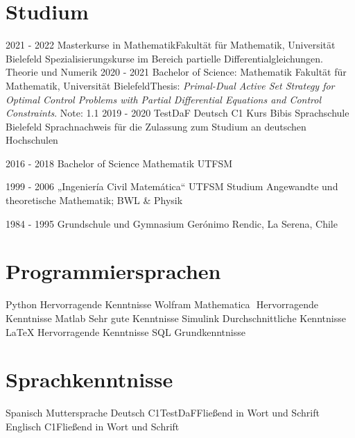 \documentclass[a4paper]{cv-class}
\begin{document}
\section{Studium}
\begin{entrylist}
\entry
{2021 - 2022}
{Masterkurse in Mathematik}{Fakultät für Mathematik, Universität Bielefeld}{ Spezialisierungskurse im Bereich partielle Differentialgleichungen. Theorie und Numerik}
\entry
{2020 - 2021}
{Bachelor of Science: Mathematik}
{Fakultät für Mathematik, Universität Bielefeld}{Thesis: {\sl Primal-Dual Active Set Strategy for Optimal Control
Problems with Partial Differential Equations and Control Constraints}. Note: 1.1}
\entry
{2019 - 2020}
{TestDaF Deutsch C1 Kurs} 
{Bibis Sprachschule Bielefeld}
{Sprachnachweis für die Zulassung zum Studium an deutschen Hochschulen}


\entry
    {2016 - 2018}
    {Bachelor of Science Mathematik}
    {UTFSM}
    
  \entry
    {1999 - 2006}
    {„Ingenier\'ia Civil Matem\'atica“}
    {UTFSM}
        {Studium Angewandte und theoretische Mathematik; BWL \& Physik}
        
    
\entry
{1984 - 1995}
{Grundschule und Gymnasium}
{Ger\'onimo Rendic, La Serena, Chile}
{}
\end{entrylist}
\section{Programmiersprachen}
\begin{entrylist}
\entry
{Python}
{Hervorragende Kenntnisse}{}{}
\entry
{Wolfram Mathematica\!}
{\,\,Hervorragende Kenntnisse}{}{}
\entry
{Matlab}
{Sehr gute Kenntnisse}{}{}
\entry
{Simulink}
{Durchschnittliche Kenntnisse}{}{}
\entry
{\LaTeX{}}
{Hervorragende Kenntnisse}{}{}
\entry
{SQL}
{Grundkenntnisse}{}{}
\end{entrylist}
\section{Sprachkenntnisse}
\begin{entrylist}
\entry
{Spanisch}
{Muttersprache}{}{}
\entry
{Deutsch}
{C1}{TestDaF}{Fließend in Wort und Schrift}
\entry
{Englisch}
{C1}{}{Fließend in Wort und Schrift}

\end{entrylist}
\end{document}
